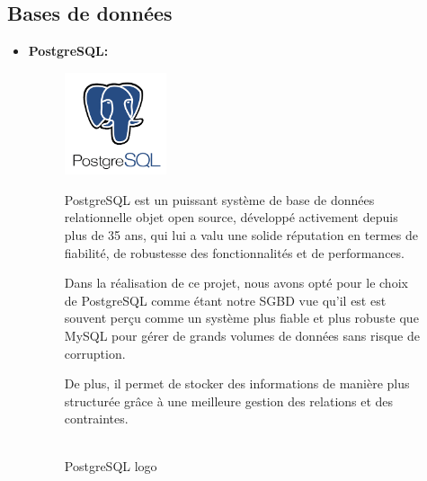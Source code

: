     \subsection {Bases de données}
    \newpage
    \begin{itemize}
        \item \textbf{PostgreSQL: }
    
        \begin{figure}[!htb]\centering
           \begin{minipage}{0.30\textwidth}
           \centering
             {\includegraphics[width = 3cm , height=3cm]{img/techno/postgresql.png}}
             \caption{ \\ PostgreSQL logo \cite{pg}}\label{Fig:Data2}
           \end{minipage}
           \begin {minipage}{0.60\textwidth}
           \par PostgreSQL est un puissant système de base de données relationnelle objet open source, développé activement depuis plus de 35 ans, qui lui a valu une solide réputation en termes de fiabilité, de robustesse des fonctionnalités et de performances\cite{pg}. \\
           \par Dans la réalisation de ce projet, nous avons opté pour le choix de PostgreSQL comme étant notre SGBD vue qu'il est est souvent perçu comme un système plus fiable et plus robuste que MySQL pour gérer de grands volumes de données sans risque de corruption.\\
           \par De plus, il permet de stocker des informations de manière plus structurée grâce à une meilleure gestion des relations et des contraintes.
           \end{minipage}
       \end{figure}
    
\end{itemize}

